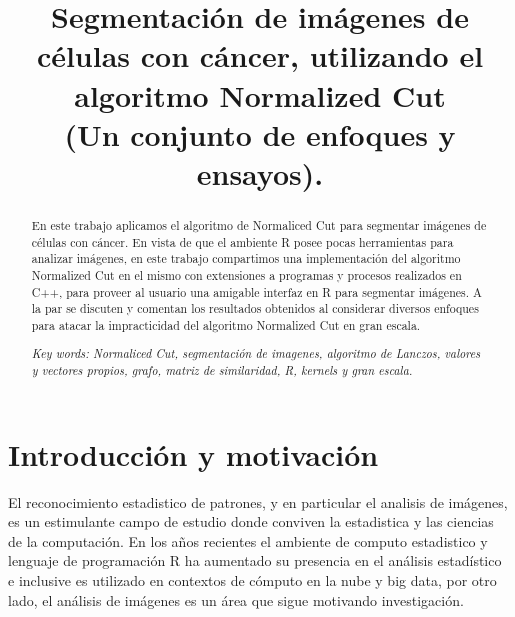 \documentclass[conference]{IEEEtran}
\begin{document}
\title{Segmentación de imágenes de células con cáncer, utilizando el algoritmo Normalized Cut\\ \small (Un conjunto de enfoques y ensayos).   }


\author{
}



\maketitle

\begin{abstract}
En este trabajo aplicamos el algoritmo de Normaliced Cut para segmentar imágenes de células con cáncer. En vista de que el ambiente R \cite{R} posee pocas herramientas para analizar imágenes, en este trabajo compartimos una implementación del algoritmo Normalized Cut en el mismo con extensiones a programas y procesos realizados en C++, para proveer al usuario una amigable interfaz en R para segmentar imágenes. A la par se discuten y comentan los resultados obtenidos al considerar diversos enfoques para atacar la impracticidad del algoritmo Normalized Cut en gran escala. 

\textit{Key words: Normaliced Cut, segmentación de imagenes, algoritmo de Lanczos, valores y vectores propios, grafo, matriz de similaridad, R, kernels y gran escala.
}\end{abstract}

\IEEEpeerreviewmaketitle


\section{Introducción y motivación}
El reconocimiento estadistico de patrones, y en particular el analisis de imágenes, es un estimulante campo de estudio donde conviven la estadistica y las ciencias de la computación. En los años recientes el ambiente de computo estadistico y lenguaje de programación R \cite{R} ha aumentado su presencia en el análisis estadístico e inclusive es utilizado en contextos de cómputo en la nube y big data, por otro lado, el análisis de imágenes es un área que sigue motivando investigación.\\
\end{document}
